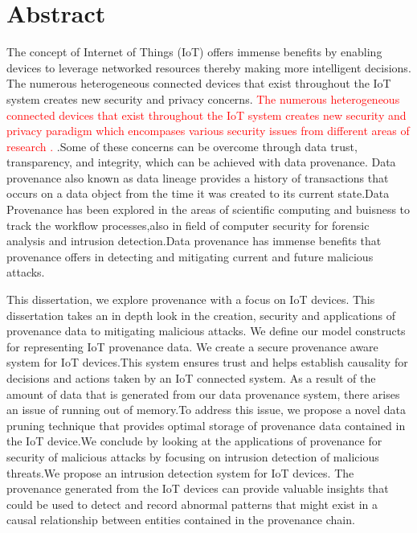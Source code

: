 

\chapter*{Abstract}
The concept of Internet of Things (IoT) offers immense benefits by
enabling devices to leverage networked resources thereby making more intelligent
decisions. The numerous heterogeneous connected devices that exist throughout
the IoT system creates new security and privacy concerns. \textcolor{red}{The numerous heterogeneous connected devices that exist throughout
the IoT system creates new security and privacy paradigm which encompases various security issues from different areas of research .} .Some of these concerns can
be overcome through data trust, transparency, and integrity, which can be
achieved with data provenance. Data provenance also known as data lineage provides a history of transactions that occurs on a data object from the time it was created to its current state.Data Provenance has been explored in the areas of scientific computing and buisness to track the workflow processes,also in field of computer security for forensic analysis and intrusion detection.Data provenance has immense benefits that provenance offers in detecting and mitigating current and future malicious attacks.  \par This dissertation, we explore provenance with a focus on IoT devices. This dissertation takes an in depth look  in the creation, security and applications of provenance data to mitigating malicious attacks. We define our model constructs for representing IoT provenance data. We create a secure provenance aware system for IoT devices.This system ensures trust and helps establish causality for decisions and actions taken by an IoT connected system. As a result of the amount of data that is generated from our data provenance system, there arises an issue of running out of memory.To address this issue, we propose a novel data pruning technique that provides optimal storage of provenance data contained in the IoT device.We conclude by looking at the applications of provenance for security of malicious attacks by focusing on intrusion detection of malicious threats.We propose an intrusion detection system for IoT devices. The provenance generated from the IoT devices can provide valuable insights that could be used to detect and record abnormal patterns that might exist in a causal relationship between entities contained in the provenance chain.

